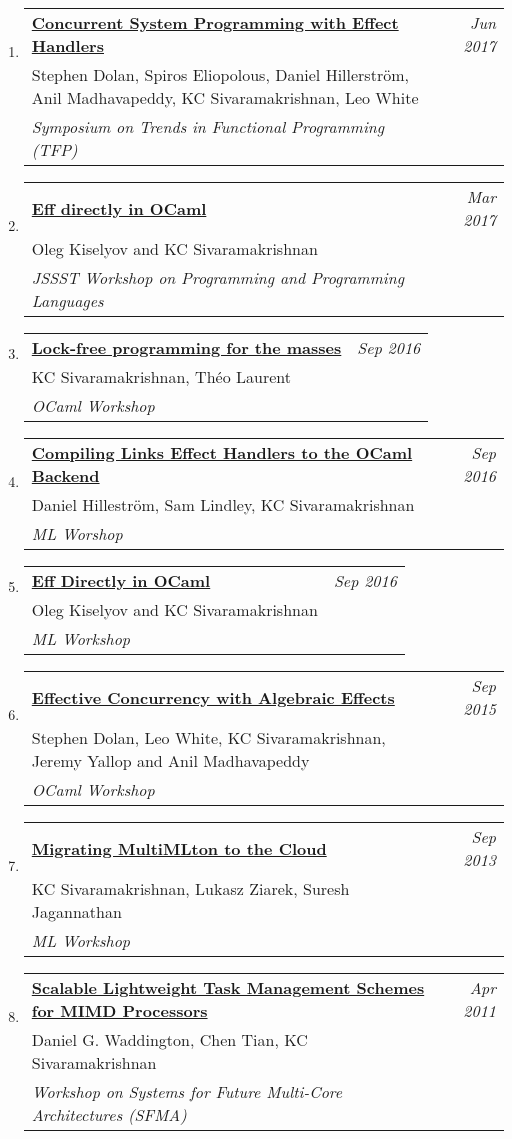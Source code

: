 \documentclass[10pt]{article}
\makeatletter
\newcommand{\lbar}[1]{{\color{#1}\ding{118}}\hspace*{2pt}}
\newenvironment{benumerate}[2]{
    \let\oldItem\item
    \def\item{\addtocounter{enumi}{-2}\oldItem}
    \begin{enumerate}[#2] \itemsep3pt
    \setcounter{enumi}{#1}
    \addtocounter{enumi}{1}}
  {\end{enumerate}}
\newenvironment{publication}[5]
{ \item
  \begin{tabular*}{7.5in}{p{6.3in}@{\extracolsep{\fill}}r}
    \href{#1}{\textbf{#2}} & \textit{#3}\\ #4 &\\ \textit{#5}&\\
  \end{tabular*}
} {}
\newenvironment{region}[3]{%
  \vspace*{0.5ex}
  {\scalebox{1.4}{\textbf{#1}}}
  \begin{benumerate}{#3}{\color{RoyalBlue}#2}}
  {\end{benumerate}\vspace{0.8ex}}
\makeatother
\begin{document}
\begin{region} {\lbar{purple}Workshop Publications}{{W}1}{16}
  \begin{publication}{http://kcsrk.info/papers/system_effects_feb_18.pdf}
    {Concurrent System Programming with Effect Handlers}
    {Jun 2017}{Stephen Dolan, Spiros Eliopolous, Daniel Hillerström, Anil Madhavapeddy, KC Sivaramakrishnan, Leo White}
    {Symposium on Trends in Functional Programming (TFP)}
  \end{publication}

  \begin{publication}{http://kcsrk.info/papers/eff_ocaml_ppl17.pdf}
    {Eff directly in OCaml}
    {Mar 2017}{Oleg Kiselyov and KC Sivaramakrishnan}
    {JSSST Workshop on Programming and Programming Languages}
  \end{publication}

  \begin{publication}{http://kcsrk.info/papers/reagents_ocaml16.pdf}
    {Lock-free programming for the masses}
    {Sep 2016}{KC Sivaramakrishnan, Théo Laurent}
    {OCaml Workshop}
  \end{publication}

  \begin{publication}{http://kcsrk.info/papers/links_ocaml_ml16.pdf}
    {Compiling Links Effect Handlers to the OCaml Backend}
    {Sep 2016}{Daniel Hilleström, Sam Lindley, KC Sivaramakrishnan}
    {ML Worshop}
  \end{publication}

  \begin{publication}{http://kcsrk.info/papers/eff_ocaml_ml16.pdf}
    {Eff Directly in OCaml}
    {Sep 2016}{Oleg Kiselyov and KC Sivaramakrishnan}
    {ML Workshop}
  \end{publication}

  \begin{publication}{http://kcsrk.info/papers/effects_ocaml15.pdf}
    {Effective Concurrency with Algebraic Effects}
    {Sep 2015}{Stephen Dolan, Leo White, KC Sivaramakrishnan, Jeremy Yallop and Anil Madhavapeddy}
    {OCaml Workshop}
  \end{publication}

  \begin{publication}{http://kcsrk.info/papers/mmcloud_mlw13.pdf}
    {Migrating MultiMLton to the Cloud}
    {Sep 2013}{KC Sivaramakrishnan, Lukasz Ziarek, Suresh Jagannathan}
    {ML Workshop}
  \end{publication}

  \begin{publication}{http://kcsrk.info/papers/snapple_sfma11.pdf}
    {Scalable Lightweight Task Management Schemes for MIMD Processors}
    {Apr 2011}{Daniel G. Waddington, Chen Tian, KC Sivaramakrishnan}
    {Workshop on Systems for Future Multi-Core Architectures (SFMA)}
  \end{publication}


\end{region}
\end{document}
